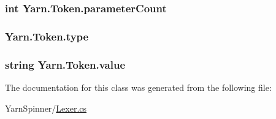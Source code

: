 \hypertarget{a00147_adf11c0d29b66935a8d8109d6308d0488}{
\subsubsection[{parameter\-Count}]{\setlength{\rightskip}{0pt plus 5cm}int Yarn.\-Token.\-parameter\-Count}}\label{a00147_adf11c0d29b66935a8d8109d6308d0488}
\hypertarget{a00147_a471a25da67fda0524f2375f9a882aafa}{
\subsubsection[{type}]{ Yarn.\-Token.\-type}}\label{a00147_a471a25da67fda0524f2375f9a882aafa}
\hypertarget{a00147_a3df6b32d6190a639619a3f064c2154e2}{
\subsubsection[{value}]{\setlength{\rightskip}{0pt plus 5cm}string Yarn.\-Token.\-value}}\label{a00147_a3df6b32d6190a639619a3f064c2154e2}


The documentation for this class was generated from the following file\-:\begin{DoxyCompactItemize}
\item 
Yarn\-Spinner/\hyperlink{a00263}{Lexer.\-cs}\end{DoxyCompactItemize}
